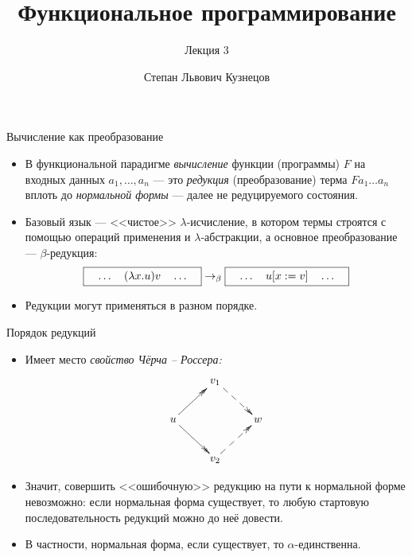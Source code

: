 \documentclass[xcolor=dvipsnames]{beamer}
\begin{document}
\title{Функциональное программирование}
\subtitle{Лекция 3}
\date{}
\author{Степан Львович Кузнецов}

\maketitle

\iffalse 
\begin{frame}{Вычисление как преобразование}
 
 \begin{itemize}[<+->]
  \item В функциональной парадигме {\em вычисление} функции (программы) $F$ на входных данных $a_1, \ldots, a_n$ --- это {\em редукция} (преобразование) терма
  $F a_1 \ldots a_n$ вплоть до {\em нормальной формы} --- далее не редуцируемого состояния.
  
  \item Базовый язык --- <<чистое>> $\lambda$-исчисление, в котором термы строятся с помощью операций применения и $\lambda$-абстракции, а основное преобразование --- $\beta$-редукция:
  \[
  \mbox{\fbox{$\quad\ldots\quad (\lambda x.u)v \quad \ldots\quad$}} \to_\beta
  \mbox{\fbox{$\quad\ldots\quad u[x:=v] \quad \ldots\quad$}}
 \]

 \item Редукции могут применяться в разном порядке.
 \end{itemize}

 
\end{frame}

\begin{frame}{Порядок редукций}

\begin{itemize}[<+->]
 \item Имеет место {\em свойство Чёрча -- Россера:}
 \[
  \xymatrix{
   & v_1 \ar@{-->>}[dr] & \\
  u \ar@{->>}[ur]\ar@{->>}[dr] & & w \\
  & v_2 \ar@{-->>}[ur]
  }
 \]
 \item Значит, совершить <<ошибочную>> редукцию на пути к нормальной форме невозможно: если нормальная форма существует, то любую стартовую последовательность редукций можно до неё довести.
 
 \item В частности, нормальная форма, если существует, то $\alpha$-единственна.
\end{itemize}


\end{frame}
\end{document}

